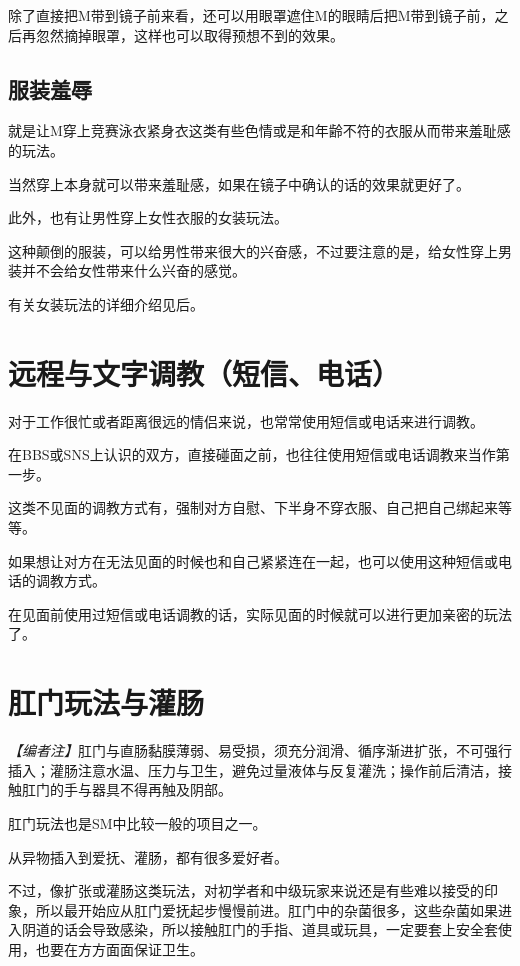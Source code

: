 \documentclass[12pt,UTF8]{ctexbook}
\begin{document}
除了直接把M带到镜子前来看，还可以用眼罩遮住M的眼睛后把M带到镜子前，之后再忽然摘掉眼罩，这样也可以取得预想不到的效果。

\subsection{服装羞辱}

就是让M穿上竞赛泳衣紧身衣这类有些色情或是和年齢不符的衣服从而带来羞耻感的玩法。

当然穿上本身就可以带来羞耻感，如果在镜子中确认的话的效果就更好了。

此外，也有让男性穿上女性衣服的女装玩法。

这种颠倒的服装，可以给男性带来很大的兴奋感，不过要注意的是，给女性穿上男装并不会给女性带来什么兴奋的感觉。

有关女装玩法的详细介绍见后。

\section{远程与文字调教（短信、电话）}

对于工作很忙或者距离很远的情侣来说，也常常使用短信或电话来进行调教。

在BBS或SNS上认识的双方，直接碰面之前，也往往使用短信或电话调教来当作第一步。

这类不见面的调教方式有，强制对方自慰、下半身不穿衣服、自己把自己绑起来等等。

如果想让对方在无法见面的时候也和自己紧紧连在一起，也可以使用这种短信或电话的调教方式。

在见面前使用过短信或电话调教的话，实际见面的时候就可以进行更加亲密的玩法了。

\section{肛门玩法与灌肠}

\noindent\textit{【编者注】}肛门与直肠黏膜薄弱、易受损，须充分润滑、循序渐进扩张，不可强行插入；灌肠注意水温、压力与卫生，避免过量液体与反复灌洗；操作前后清洁，接触肛门的手与器具不得再触及阴部。

肛门玩法也是SM中比较一般的项目之一。

从异物插入到爱抚、灌肠，都有很多爱好者。

不过，像扩张或灌肠这类玩法，对初学者和中级玩家来说还是有些难以接受的印象，所以最开始应从肛门爱抚起步慢慢前进。肛门中的杂菌很多，这些杂菌如果进入阴道的话会导致感染，所以接触肛门的手指、道具或玩具，一定要套上安全套使用，也要在方方面面保证卫生。
\end{document}
